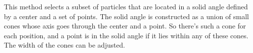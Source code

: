 \-This method selects a subset of particles that are located in a solid angle defined by a center and a set of points. \-The solid angle is constructed as a union of small cones whose axis goes through the center and a point. \-So there's such a cone for each position, and a point is in the solid angle if it lies within any of these cones. \-The width of the cones can be adjusted. 